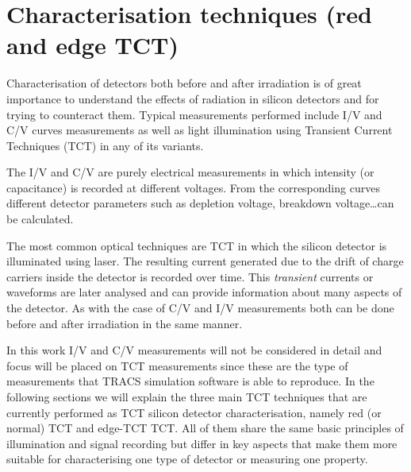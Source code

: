 \chapter{Characterisation techniques (red and edge TCT)}
\label{chap:TCT}

Characterisation of detectors both before and after irradiation is of great importance to understand the effects of radiation in silicon detectors and for trying to counteract them. Typical measurements performed include I/V and C/V curves measurements as well as light illumination using Transient Current Techniques (TCT) in any of its variants. 

The I/V and C/V are purely electrical measurements in which intensity (or capacitance) is recorded at different voltages. From the corresponding curves different detector parameters such as depletion voltage, breakdown voltage\ldots can be calculated. 

The most common optical techniques are TCT in which the silicon detector is illuminated using laser. The resulting current generated due to the drift of charge carriers inside the detector is recorded over time. This \textit{transient} currents or waveforms are later analysed and can provide information about many aspects of the detector. As with the case of C/V and I/V measurements both can be done before and after irradiation in the same manner.

In this work I/V and C/V measurements will not be considered in detail and focus will be placed on TCT measurements since these are the type of measurements that TRACS simulation software is able to reproduce. In the following sections we will explain the three main TCT techniques that are currently performed as TCT silicon detector characterisation, namely red (or normal) TCT and edge-TCT TCT. All of them share the same basic principles of illumination and signal recording but differ in key aspects that make them more suitable for characterising one type of detector or measuring one property. 

